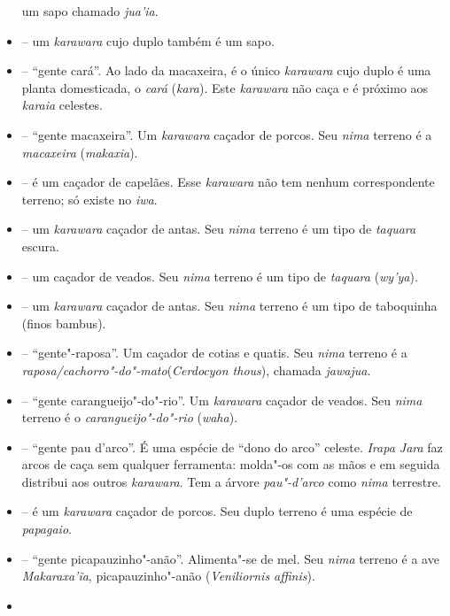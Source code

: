 \begin{itemize}
  um sapo chamado \emph{jua'ia}.
\item
  \emph{} -- um \emph{karawara} cujo duplo também é
  um sapo.
\item
  \emph{} -- ``gente cará''. Ao lado da macaxeira, é o único
  \emph{karawara} cujo duplo é uma planta domesticada, o \emph{cará}
  (\emph{kara}). Este \emph{karawara} não caça e é próximo aos
  \emph{karaia} celestes.
\item
  \emph{} -- ``gente macaxeira''. Um \emph{karawara} caçador de porcos. Seu
  \emph{nima} terreno é a \emph{macaxeira} (\emph{makaxia}).
\item
  \emph{} -- é um caçador de capelães. Esse
  \emph{karawara} não tem nenhum correspondente terreno; só existe no
  \emph{iwa}.
\item
  \emph{} -- um \emph{karawara} caçador de
  antas. Seu \emph{nima} terreno é um tipo de \emph{taquara} escura.
\item
  \emph{} -- um caçador de veados. Seu \emph{nima}
  terreno é um tipo de \emph{taquara} (\emph{wy'ya}).
\item
  \emph{} -- um \emph{karawara} caçador de antas. Seu
  \emph{nima} terreno é um tipo de taboquinha (finos bambus).
\item
  \emph{} -- ``gente"-raposa''. Um caçador de cotias e
  quatis. Seu \emph{nima} terreno é a
  \emph{raposa/cachorro"-do"-mato}(\emph{Cerdocyon
  thous}), chamada \emph{jawajua}.
\item
  \emph{} -- ``gente carangueijo"-do"-rio''. Um \emph{karawara} caçador de veados. Seu
  \emph{nima} terreno é o \emph{carangueijo"-do"-rio} (\emph{waha}).
\item
  \emph{} -- ``gente pau d’arco''. É uma espécie de ``dono do arco'' celeste.
  \emph{Irapa Jara} faz arcos de caça sem qualquer ferramenta:
  molda"-os com as mãos e em seguida distribui aos outros
  \emph{karawara}. Tem a árvore \emph{pau"-d'arco} como \emph{nima}
  terrestre.
\item
  \emph{} -- é um \emph{karawara} caçador de porcos.
  Seu duplo terreno é uma espécie de \emph{papagaio}.
\item
  \emph{} -- ``gente picapauzinho"-anão''.
  Alimenta"-se de mel. Seu \emph{nima} terreno é a ave
  \emph{Makaraxa'ĩa}, picapauzinho"-anão (\emph{Veniliornis affinis}).
\item

\end{itemize}

